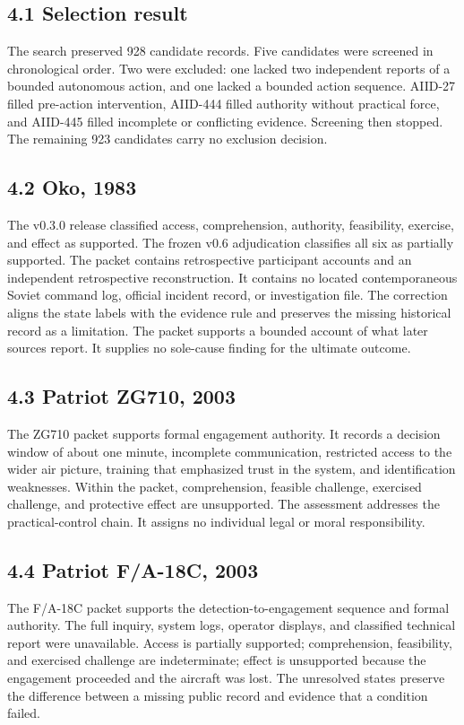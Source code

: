 \documentclass[11pt]{article}
\begin{document}
\subsection*{4.1 Selection result}
The search preserved 928 candidate records. Five candidates were screened in chronological order. Two were excluded: one lacked two independent reports of a bounded autonomous action, and one lacked a bounded action sequence. AIID-27 filled pre-action intervention, AIID-444 filled authority without practical force, and AIID-445 filled incomplete or conflicting evidence. Screening then stopped. The remaining 923 candidates carry no exclusion decision.
\subsection*{4.2 Oko, 1983}
The v0.3.0 release classified access, comprehension, authority, feasibility, exercise, and effect as supported. The frozen v0.6 adjudication classifies all six as partially supported. The packet contains retrospective participant accounts and an independent retrospective reconstruction. It contains no located contemporaneous Soviet command log, official incident record, or investigation file. The correction aligns the state labels with the evidence rule and preserves the missing historical record as a limitation. The packet supports a bounded account of what later sources report. It supplies no sole-cause finding for the ultimate outcome.
\subsection*{4.3 Patriot ZG710, 2003}
The ZG710 packet supports formal engagement authority. It records a decision window of about one minute, incomplete communication, restricted access to the wider air picture, training that emphasized trust in the system, and identification weaknesses. Within the packet, comprehension, feasible challenge, exercised challenge, and protective effect are unsupported. The assessment addresses the practical-control chain. It assigns no individual legal or moral responsibility.
\subsection*{4.4 Patriot F/A-18C, 2003}
The F/A-18C packet supports the detection-to-engagement sequence and formal authority. The full inquiry, system logs, operator displays, and classified technical report were unavailable. Access is partially supported; comprehension, feasibility, and exercised challenge are indeterminate; effect is unsupported because the engagement proceeded and the aircraft was lost. The unresolved states preserve the difference between a missing public record and evidence that a condition failed.
\end{document}

